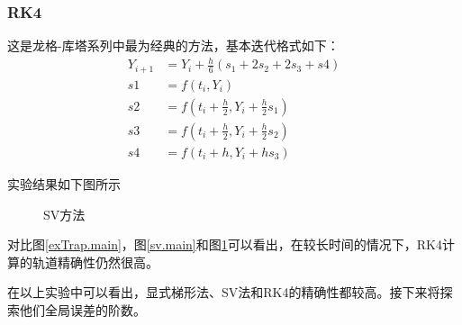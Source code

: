 \documentclass{article}
\begin{document}
\subsubsection{RK4}
\par 这是龙格-库塔系列中最为经典的方法，基本迭代格式如下：
\begin{align*}
	Y_{i+1} &= Y_i + \frac{h}{6}(s_1+2s_2+2s_3+s4)\\
	s1 &= f(t_i,Y_i)\\
	s2 &= f(t_i+\frac{h}{2},Y_i+\frac{h}{2}s_1)\\
	s3 &= f(t_i+\frac{h}{2},Y_i+\frac{h}{2}s_2)\\
	s4 &= f(t_i+h,Y_i+hs_3)
\end{align*}
\par 实验结果如下图所示
\begin{figure}[H]
	\centering  %
	\caption{SV方法}
	\label{rk4.main}
\end{figure}
\par 对比图\ref{exTrap.main}，图\ref{sv.main}和图\ref{rk4.main}可以看出，在较长时间的情况下，RK4计算的轨道精确性仍然很高。
\par 在以上实验中可以看出，显式梯形法、SV法和RK4的精确性都较高。接下来将探索他们全局误差的阶数。
\end{document}
